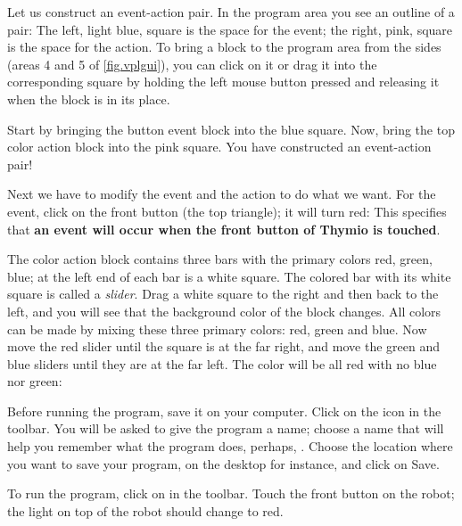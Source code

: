 Let us construct an event-action pair.
In the program area you see an outline of a pair:
The left, light blue, square is the space for the
event; the right, pink, square is the space for the action. %
To bring a block to the program area from the sides (areas 4 and 5 of \cref{fig.vplgui}), you can click on it or drag it into the corresponding square by holding the left mouse button pressed and releasing it when the block is
in its place.

Start by bringing the button event block  into the blue square.
Now, bring the top color action block  into the pink square.
You have constructed an event-action pair!

Next we have to modify the event and the action to do what we want. For
the event, click on the front button (the top triangle); it will turn
red: 
This specifies that \textbf{an event will occur when the front button of Thymio is touched}.

The color action block contains three bars with the primary colors red,
green, blue; at the left end of each bar is a white square. The colored
bar with its white square is called a \emph{slider}. Drag a white square
to the right and then back to the left, and you will see that the
background color of the block changes.
All colors can be made by mixing these three primary colors: red, green and blue.
Now move the red slider until the
square is at the far right, and move the green and blue sliders until
they are at the far left. The color will be all red with no blue nor
green: 


Before running the program, save it on your computer.
Click on the icon 
in the toolbar. You will be asked to give the program a name; choose a
name that will help you remember what the program does, perhaps,
.
Choose the location where you want to save your program, on the desktop for instance, and click on Save.


To run the program, click on  in the toolbar. Touch
the front button on the robot; the light on top of the robot should
change to red.


